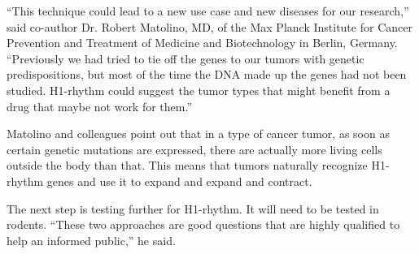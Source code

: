 \documentclass{article}
\begin{document}
“This technique could lead to a new use case and new diseases for our research,” said co-author Dr. Robert Matolino, MD, of the Max Planck Institute for Cancer Prevention and Treatment of Medicine and Biotechnology in Berlin, Germany. “Previously we had tried to tie off the genes to our tumors with genetic predispositions, but most of the time the DNA made up the genes had not been studied. H1-rhythm could suggest the tumor types that might benefit from a drug that maybe not work for them.”

Matolino and colleagues point out that in a type of cancer tumor, as soon as certain genetic mutations are expressed, there are actually more living cells outside the body than that. This means that tumors naturally recognize H1-rhythm genes and use it to expand and expand and contract.

The next step is testing further for H1-rhythm. It will need to be tested in rodents. “These two approaches are good questions that are highly qualified to help an informed public,” he said.
\end{document}
